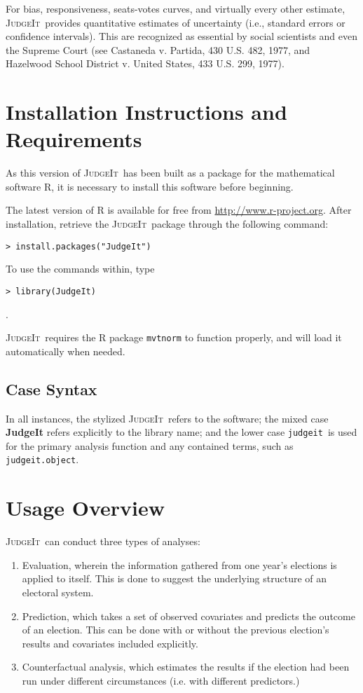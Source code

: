 \documentclass[oneside,letterpaper,titlepage]{article}
\newcommand{\JudgeIt}{\textsc{JudgeIt}\ }
\newcommand{\jud}{\texttt{judgeit}\ }
\begin{document}
For bias, responsiveness, seats-votes curves, and virtually every other estimate, \JudgeIt provides quantitative estimates of uncertainty (i.e., standard errors or confidence intervals).  This are recognized as essential by social scientists and even the Supreme Court (see Castaneda v.  Partida, 430 U.S. 482, 1977, and Hazelwood School District v. United States, 433 U.S. 299, 1977).

\section{Installation Instructions and Requirements}

As this version of \JudgeIt has been built as a package for the mathematical software R, it is necessary to install this software before beginning.

The latest version of R is available for free from \url{http://www.r-project.org}. After installation, retrieve the \JudgeIt package through the following command:

\begin{verbatim}
> install.packages("JudgeIt")
\end{verbatim}

To use the commands within, type

\begin{verbatim}
> library(JudgeIt)
\end{verbatim}.

\JudgeIt requires the R package \texttt{mvtnorm} to function properly,
and will load it automatically when needed.

\subsection*{Case Syntax}

In all instances, the stylized \JudgeIt refers to the software; the mixed case \textbf{JudgeIt} refers explicitly to the library name; and the lower case \jud is used for the primary analysis function and any contained terms, such as \texttt{judgeit.object}.

\section{Usage Overview}

\JudgeIt can conduct three types of analyses:

\begin{enumerate}
\item Evaluation, wherein the information gathered from one year's elections is applied to itself. This is done to suggest the underlying structure of an electoral system.

\item Prediction, which takes a set of observed covariates and predicts the outcome of an election. This can be done with or without the previous election's results and covariates included explicitly.

\item Counterfactual analysis, which estimates the results if the election had been run under different circumstances (i.e. with different predictors.)
\end{enumerate}
\end{document}
